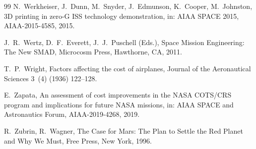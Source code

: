 \documentclass[preprint,12pt]{elsarticle}
\begin{document}
\begin{thebibliography}{99}
N.~Werkheiser, J.~Dunn, M.~Snyder, J.~Edmunson, K.~Cooper, M.~Johnston,
\newblock 3D printing in zero-G ISS technology demonstration,
\newblock in: AIAA SPACE 2015, AIAA-2015-4585, 2015.

J.~R.~Wertz, D.~F.~Everett, J.~J.~Puschell (Eds.),
\newblock Space Mission Engineering: The New SMAD,
\newblock Microcosm Press, Hawthorne, CA, 2011.

T.~P.~Wright,
\newblock Factors affecting the cost of airplanes,
\newblock Journal of the Aeronautical Sciences 3~(4) (1936) 122--128.

E.~Zapata,
\newblock An assessment of cost improvements in the NASA COTS/CRS program and implications for future NASA missions,
\newblock in: AIAA SPACE and Astronautics Forum, AIAA-2019-4268, 2019.

R.~Zubrin, R.~Wagner,
\newblock The Case for Mars: The Plan to Settle the Red Planet and Why We Must,
\newblock Free Press, New York, 1996.

\end{thebibliography}
\end{document}

